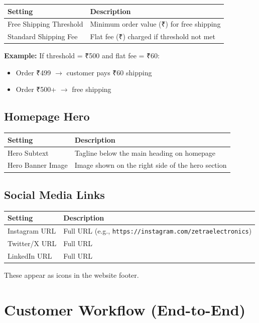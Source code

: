 \documentclass[12pt,a4paper]{article}
\begin{document}
\begin{tabular}{@{}L{5cm} L{8cm}@{}}
\toprule
\textbf{Setting} & \textbf{Description} \\
\midrule
Free Shipping Threshold & Minimum order value (₹) for free shipping \\
Standard Shipping Fee & Flat fee (₹) charged if threshold not met \\
\bottomrule
\end{tabular}

\textbf{Example:} If threshold = ₹500 and flat fee = ₹60:
\begin{itemize}[leftmargin=1.5em, itemsep=3pt]
  \item Order ₹499 $\rightarrow$ customer pays ₹60 shipping
  \item Order ₹500+ $\rightarrow$ free shipping
\end{itemize}

\subsection{Homepage Hero}

\begin{tabular}{@{}L{5cm} L{8cm}@{}}
\toprule
\textbf{Setting} & \textbf{Description} \\
\midrule
Hero Subtext & Tagline below the main heading on homepage \\
Hero Banner Image & Image shown on the right side of the hero section \\
\bottomrule
\end{tabular}

\subsection{Social Media Links}

\begin{tabular}{@{}L{5cm} L{8cm}@{}}
\toprule
\textbf{Setting} & \textbf{Description} \\
\midrule
Instagram URL & Full URL (e.g., \texttt{https://instagram.com/zetraelectronics}) \\
Twitter/X URL & Full URL \\
LinkedIn URL & Full URL \\
\bottomrule
\end{tabular}

These appear as icons in the website footer.

\section{Customer Workflow (End-to-End)}
\end{document}
